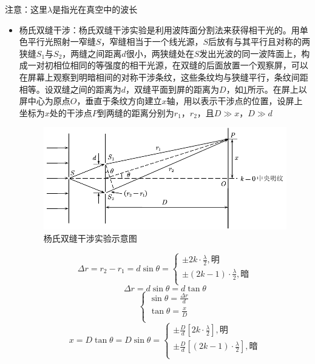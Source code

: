 \documentclass[12pt, a4paper, twoside]{ctexbook}
\begin{document}
{\sonti 注意}：这里$\lambda$是指光在真空中的波长
\begin{itemize}
    \item {\sonti 杨氏双缝干涉}：杨氏双缝干涉实验是利用波阵面分割法来获得相干光的。用单色平行光照射一窄缝$S$，窄缝相当于一个线光源，$S$后放有与其平行且对称的两狭缝$S_1$与$S_2$，两缝之间距离$d$很小，两狭缝处在$S$发出光波的同一波阵面上，构成一对初相位相同的等强度的相干光源，在双缝的后面放置一个观察屏，可以在屏幕上观察到明暗相间的对称干涉条纹，这些条纹均与狭缝平行，条纹间距相等。设双缝之间的距离为$d$，双缝平面到屏的距离为$D$，如\textcolor{blue}{\cref{fig:杨氏双缝干涉}}所示。在屏上以屏中心为原点$O$，垂直于条纹方向建立$x$轴，用以表示干涉点的位置，设屏上坐标为$x$处的干涉点$P$到两缝的距离分别为$r_1$，$r_2$，且$D\gg x$，$D\gg d$
    \begin{figure}[H]
        \centerline{\includegraphics[scale=0.88]{杨氏双缝干涉.pdf}}
        \caption{杨氏双缝干涉实验示意图}\label{fig:杨氏双缝干涉}
    \end{figure}
    $$
    \Delta r=r_2-r_1=d\sin\theta=\left\{ \begin{array}{l}
        \pm 2k\cdot \frac{\lambda}{2},\text{明}\\
        \pm \left( 2k-1 \right) \cdot \frac{\lambda}{2},\text{暗}\\
    \end{array} \right. 
    $$
    $$
    \Delta r=d\sin\theta=d\tan\theta
    $$
    $$
    \left\{ \begin{array}{l}
        \sin \theta =\frac{\Delta r}{d}\\
        \tan \theta =\frac{x}{D}\\
    \end{array} \right. 
    $$
    $$
    x=D\tan\theta=D\sin\theta=\left\{ \begin{array}{l}
        \pm \frac{D}{d}\left[ 2k\cdot \frac{\lambda}{2} \right] ,\text{明}\\
        \pm \frac{D}{d}\left[ \left( 2k-1 \right) \cdot \frac{\lambda}{2} \right] ,\text{暗}\\

\end{array}$$
\end{itemize}
\end{document}
